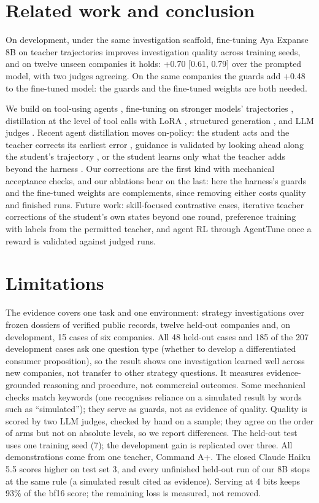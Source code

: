\documentclass[11pt]{article}
\begin{document}
\section{Related work and conclusion}

On development, under the same investigation scaffold, fine-tuning Aya Expanse 8B on teacher trajectories improves
investigation quality across training seeds, and on twelve unseen companies it holds: +0.70 [0.61, 0.79] over the
prompted model, with two judges agreeing. On the same companies the guards add +0.48 to the
fine-tuned model: the guards and the fine-tuned weights are both needed.

We build on tool-using agents \citep{yao2023react,schick2023toolformer}, fine-tuning on stronger models' trajectories
\citep{chen2023fireact,zeng2023agenttuning}, distillation \citep{hinton2015distilling} at the level of tool calls with
LoRA \citep{hu2022lora}, structured generation \citep{willard2023guided}, and LLM judges \citep{zheng2023judging}.
Recent agent distillation moves on-policy: the student acts and the teacher corrects its earliest error
\citep{lyu2026score}, guidance is validated by looking ahead along the student's trajectory \citep{chen2026lookahead},
or the student learns only what the teacher adds beyond the harness \citep{choi2026had}. Our corrections are the first
kind with mechanical acceptance checks, and our ablations bear on the last: here the harness's guards and the
fine-tuned weights are complements, since removing either costs quality and finished runs.
Future work: skill-focused contrastive cases, iterative teacher corrections of the student's own states beyond one round,
preference training with labels from the permitted teacher, and agent RL through AgentTune once a reward is validated
against judged runs.

\section*{Limitations}

The evidence covers one task and one environment: strategy investigations over frozen dossiers of verified public records,
twelve held-out companies and, on development, 15 cases of six companies. All 48 held-out cases and 185 of the 207 development cases ask one question type (whether to develop a
differentiated consumer proposition), so the result shows one investigation learned well across new companies, not
transfer to other strategy questions. It measures evidence-grounded reasoning and procedure, not commercial outcomes.
Some mechanical checks match keywords (one recognises reliance on a simulated result by words such as
``simulated''); they serve as guards, not as evidence of quality. Quality is scored by two LLM judges, checked by hand on a sample; they agree on the order of arms
but not on absolute levels, so we report differences. The held-out test uses one training seed (7); the development
gain is replicated over three. All demonstrations come from one teacher, Command A+. The closed Claude Haiku 5.5 scores
higher on test set 3, and every unfinished held-out run of our 8B stops at the same rule (a simulated result cited as
evidence). Serving at 4 bits keeps 93\% of the bf16 score; the remaining loss is measured, not removed.
\end{document}
